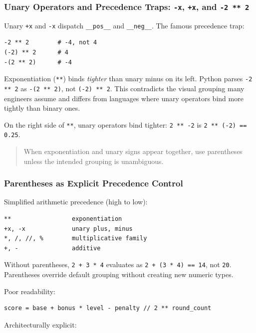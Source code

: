 \documentclass[a4paper,twoside]{report}
\begin{document}
\subsubsection{Unary Operators and Precedence Traps: \texttt{-x}, \texttt{+x}, and \texttt{-2 ** 2}}

Unary \texttt{+x} and \texttt{-x} dispatch \texttt{\_\_pos\_\_} and \texttt{\_\_neg\_\_}. The famous precedence trap:

\begin{verbatim}
-2 ** 2        # -4, not 4
(-2) ** 2      # 4
-(2 ** 2)      # -4
\end{verbatim}

Exponentiation (\texttt{**}) binds \emph{tighter} than unary minus on its left. Python parses \texttt{-2 ** 2} as \texttt{-(2 ** 2)}, not \texttt{(-2) ** 2}. This contradicts the visual grouping many engineers assume and differs from languages where unary operators bind more tightly than binary ones.

On the right side of \texttt{**}, unary operators bind tighter: \texttt{2 ** -2} is \texttt{2 ** (-2) == 0.25}.

\begin{quote}
When exponentiation and unary signs appear together, use parentheses unless the intended grouping is unambiguous.
\end{quote}

\subsubsection{Parentheses as Explicit Precedence Control}

Simplified arithmetic precedence (high to low):

\begin{verbatim}
**                 exponentiation
+x, -x             unary plus, minus
*, /, //, %        multiplicative family
+, -               additive
\end{verbatim}

Without parentheses, \texttt{2 + 3 * 4} evaluates as \texttt{2 + (3 * 4) == 14}, not \texttt{20}. Parentheses override default grouping without creating new numeric types.

Poor readability:

\begin{verbatim}
score = base + bonus * level - penalty // 2 ** round_count
\end{verbatim}

Architecturally explicit:
\end{document}
